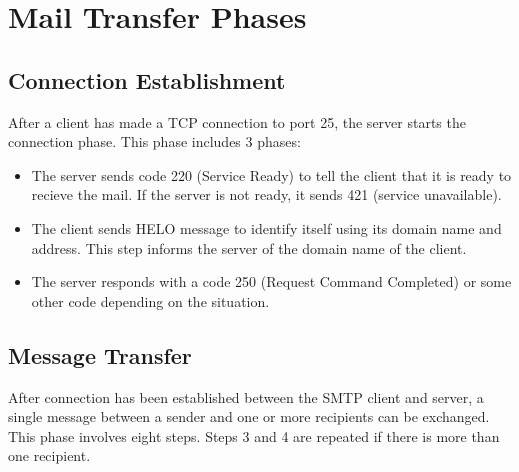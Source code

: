 \documentclass[a4paper,12pt]{article}
\begin{document}
\section{Mail Transfer Phases}
\subsection{Connection Establishment}
After a client has made a TCP connection to port 25, the server starts the connection 
phase.
This phase includes 3 phases:
\begin{itemize}
    \item The server sends code 220 (Service Ready) to tell the client that it is ready 
    to recieve the mail. If the server is not ready, it sends 421 (service unavailable).
    \item The client sends HELO message to identify itself using its domain name and
    address. This step informs the server of the domain name of the client.
    \item The server responds with a code 250 (Request Command Completed) or some other 
    code depending on the situation.
\end{itemize}

\subsection{Message Transfer}
After connection has been established between the SMTP client and server, 
a single message between a sender and one or more recipients can be exchanged. 
This phase involves eight steps. Steps 3 and 4 are repeated if there is more than 
one recipient.
\end{document}
